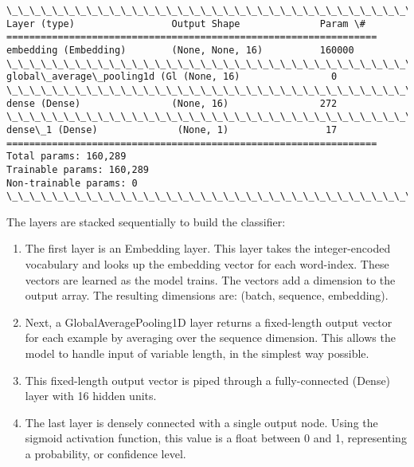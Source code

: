 \documentclass[11pt]{article}
\providecommand{\tightlist}{%
      \setlength{\itemsep}{0pt}\setlength{\parskip}{0pt}}
\begin{document}
    \begin{Verbatim}[commandchars=\\\{\}]
\_\_\_\_\_\_\_\_\_\_\_\_\_\_\_\_\_\_\_\_\_\_\_\_\_\_\_\_\_\_\_\_\_\_\_\_\_\_\_\_\_\_\_\_\_\_\_\_\_\_\_\_\_\_\_\_\_\_\_\_\_\_\_\_\_
Layer (type)                 Output Shape              Param \#   
=================================================================
embedding (Embedding)        (None, None, 16)          160000    
\_\_\_\_\_\_\_\_\_\_\_\_\_\_\_\_\_\_\_\_\_\_\_\_\_\_\_\_\_\_\_\_\_\_\_\_\_\_\_\_\_\_\_\_\_\_\_\_\_\_\_\_\_\_\_\_\_\_\_\_\_\_\_\_\_
global\_average\_pooling1d (Gl (None, 16)                0         
\_\_\_\_\_\_\_\_\_\_\_\_\_\_\_\_\_\_\_\_\_\_\_\_\_\_\_\_\_\_\_\_\_\_\_\_\_\_\_\_\_\_\_\_\_\_\_\_\_\_\_\_\_\_\_\_\_\_\_\_\_\_\_\_\_
dense (Dense)                (None, 16)                272       
\_\_\_\_\_\_\_\_\_\_\_\_\_\_\_\_\_\_\_\_\_\_\_\_\_\_\_\_\_\_\_\_\_\_\_\_\_\_\_\_\_\_\_\_\_\_\_\_\_\_\_\_\_\_\_\_\_\_\_\_\_\_\_\_\_
dense\_1 (Dense)              (None, 1)                 17        
=================================================================
Total params: 160,289
Trainable params: 160,289
Non-trainable params: 0
\_\_\_\_\_\_\_\_\_\_\_\_\_\_\_\_\_\_\_\_\_\_\_\_\_\_\_\_\_\_\_\_\_\_\_\_\_\_\_\_\_\_\_\_\_\_\_\_\_\_\_\_\_\_\_\_\_\_\_\_\_\_\_\_\_

    \end{Verbatim}

    The layers are stacked sequentially to build the classifier:

\begin{enumerate}
\def\labelenumi{\arabic{enumi}.}
\tightlist
\item
  The first layer is an Embedding layer. This layer takes the
  integer-encoded vocabulary and looks up the embedding vector for each
  word-index. These vectors are learned as the model trains. The vectors
  add a dimension to the output array. The resulting dimensions are:
  (batch, sequence, embedding).
\item
  Next, a GlobalAveragePooling1D layer returns a fixed-length output
  vector for each example by averaging over the sequence dimension. This
  allows the model to handle input of variable length, in the simplest
  way possible.
\item
  This fixed-length output vector is piped through a fully-connected
  (Dense) layer with 16 hidden units.
\item
  The last layer is densely connected with a single output node. Using
  the sigmoid activation function, this value is a float between 0 and
  1, representing a probability, or confidence level.
\end{enumerate}
\end{document}
